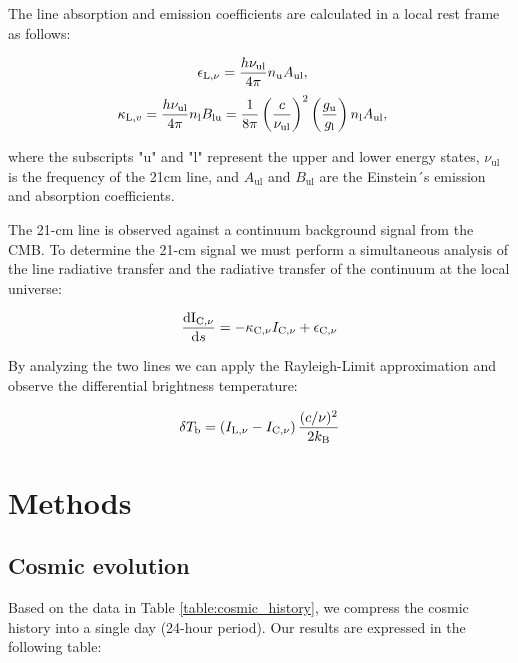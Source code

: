 \documentclass[apj]{emulateapj}
\begin{document}
The line absorption and emission coefficients are calculated in a local rest frame as follows:

\begin{equation}{\label{eq3}}
\begin{aligned}
\epsilon_{\mathrm{L}, \nu} & =\frac{h \nu_{\mathrm{ul}}}{4 \pi} n_{\mathrm{u}} A_{\mathrm{ul}},
\end{aligned}
\end{equation}
\begin{equation}{\label{eq4}}
\begin{aligned}
\kappa_{\mathrm{L}, v} & =\frac{h \nu_{\mathrm{ul}}}{4 \pi} n_{\mathrm{l}} B_{\mathrm{lu}}=\frac{1}{8 \pi}\left(\frac{c}{\nu_{\mathrm{ul}}}\right)^2\left(\frac{g_{\mathrm{u}}}{g_{\mathrm{l}}}\right) n_{\mathrm{l}} A_{\mathrm{ul}},
\end{aligned}
\end{equation}

where the subscripts "u" and "l" represent the upper and lower energy states, $\nu_{\mathrm{ul}}$ is the frequency of the 21cm line, and $A_{\mathrm{ul}}$ and $B_{\mathrm{ul}}$ are the Einstein´s emission and absorption coefficients.

The 21-cm line is observed against a continuum background signal from the CMB. To determine the 21-cm signal we must perform a simultaneous analysis of the line radiative transfer and the radiative transfer of the continuum at the local universe:

\begin{equation}{\label{eq5}}
\frac{\mathrm{dI_{\mathrm{C}, \nu}}}{\mathrm{d} s}=-\kappa_{\mathrm{C}, \nu}\\{I_{\mathrm{C}, \nu}}+{\epsilon_{\mathrm{C}, \nu}}
\end{equation}

By analyzing the two lines we can apply the Rayleigh-Limit approximation and observe the differential brightness temperature:

\begin{equation}{\label{eq6}}
\delta T_{\mathrm{b}}=\left(I_{\mathrm{L}, \nu}-I_{\mathrm{C}, \nu}\right) \frac{(c / \nu)^2}{2 k_{\mathrm{B}}}
\end{equation}

\section{Methods}
\label{sec:methods}
\subsection{Cosmic evolution}
Based on the data in Table \ref{table:cosmic_history}, we compress the cosmic history into a single day (24-hour period). Our results are expressed in the following table:
\end{document}
